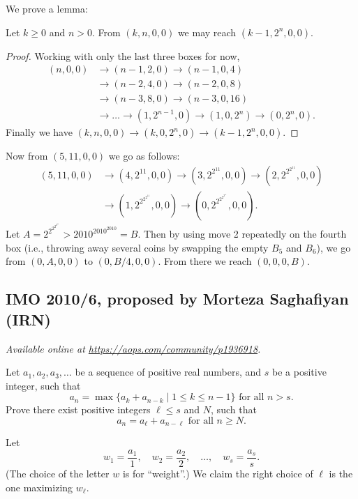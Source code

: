 \documentclass[11pt]{scrartcl}
\begin{document}
We prove a lemma:
\begin{claim*}
  Let $k \ge 0$ and $n > 0$.
  From $(k,n,0,0)$ we may reach $(k-1,2^n,0,0)$.
\end{claim*}
\begin{proof}
  Working with only the last three boxes for now,
  \begin{align*}
    (n,0,0) &\to (n-1, 2, 0) \to (n-1, 0, 4) \\
    &\to (n-2, 4, 0) \to (n-2, 0, 8) \\
    &\to (n-3, 8, 0) \to (n-3, 0, 16) \\
    &\to \dots \to (1, 2^{n-1}, 0) \to (1, 0, 2^n) \to (0, 2^n, 0).
  \end{align*}
  Finally we have $(k,n,0,0) \to (k,0,2^n,0) \to (k-1,2^n, 0,0)$.
\end{proof}

Now from $(5,11,0,0)$ we go as follows:
\begin{align*} (5,11,0,0) &\to (4, 2^{11}, 0, 0)
  \to \left(3, 2^{2^{11}}, 0, 0\right)
  \to \left(2, 2^{2^{2^{11}}}, 0, 0\right) \\
  &\to \left( 1, 2^{2^{2^{2^{11}}}}, 0, 0\right)
  \to \left(0, 2^{2^{2^{2^{2^{11}}}}}, 0, 0\right).
\end{align*}
Let $A = 2^{2^{2^{2^{2^{11}}}}} > 2010^{2010^{2010}} = B$.
Then by using move 2 repeatedly on the fourth box
(i.e., throwing away several coins by swapping the empty $B_5$ and $B_6$),
we go from $(0,A,0,0)$ to $(0,B/4,0,0)$.
From there we reach $(0,0,0,B)$.
\pagebreak

\subsection{IMO 2010/6, proposed by Morteza Saghafiyan (IRN)}
\textsl{Available online at \url{https://aops.com/community/p1936918}.}
\begin{mdframed}[style=mdpurplebox,frametitle={Problem statement}]
Let $a_1, a_2, a_3, \dots$ be a sequence of positive real numbers, and $s$ be a positive integer, such that
\[
  a_n =
  \max \{ a_k + a_{n-k} \mid 1 \leq k \leq n-1 \}
  \text{ for all $n > s$}.
\]
Prove there exist positive integers $\ell \leq s$ and $N$, such that
\[
  a_n =
  a_{\ell} + a_{n - \ell} \text{ for all $n \ge N$}.
\]
\end{mdframed}
Let \[ w_1 = \frac{a_1}{1}, \quad w_2 = \frac{a_2}{2},
    \quad \dots, \quad w_s = \frac{a_s}{s}. \]
(The choice of the letter $w$ is for ``weight''.)
We claim the right choice of $\ell$
is the one maximizing $w_\ell$.
\end{document}
